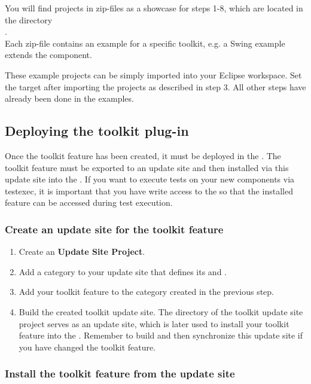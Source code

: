 You will find projects in zip-files as a showcase for steps 1-8, which are
located in the directory\\
.\\
Each zip-file contains an example for a specific toolkit, e.g. a Swing example
extends the  component.

These example projects can be simply imported into your Eclipse workspace. Set
the target after importing the projects as described in step 3. All other steps
have already been done in the examples.

\subsection{Deploying the toolkit plug-in}

Once the toolkit feature has been created, it must be deployed in the \ite{}.
The toolkit feature must be exported to an update site and then installed via
this update site into  the \ite{}.
If you want to execute tests on your new components via testexec, it is important
that you have write access to the \ite{} so that the installed feature can be 
accessed during test execution. 
 
\subsubsection{Create an update site for the toolkit feature}

\begin{enumerate}
\item Create an \textbf{Update Site Project}.
\item Add a category to your update site that defines its  and
      .
\item Add your toolkit feature to the category created in the previous step.
\item Build the created toolkit update site. The directory of the toolkit
      update site project serves as an update site, which is later used to
      install your toolkit feature into the \ite{}. Remember to build and then
      synchronize this update site if you have changed the toolkit feature.
\end{enumerate}

\subsubsection{Install the toolkit feature from the update site}


